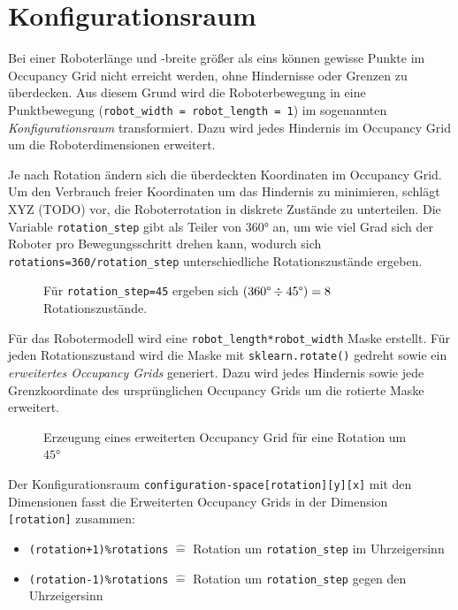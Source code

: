 \chapter{Konfigurationsraum}


Bei einer Roboterlänge und -breite größer als eins können gewisse Punkte im Occupancy Grid nicht erreicht werden, ohne Hindernisse oder Grenzen zu überdecken. 
Aus diesem Grund wird die Roboterbewegung in eine Punktbewegung (\texttt{robot\_width =  robot\_length = 1}) im sogenannten \textit{Konfigurationsraum} transformiert.
Dazu wird jedes Hindernis im Occupancy Grid um die Roboterdimensionen erweitert.

Je nach Rotation ändern sich die überdeckten Koordinaten im Occupancy Grid.
Um den Verbrauch freier Koordinaten um das Hindernis zu minimieren, schlägt XYZ (TODO) vor, die Roboterrotation in diskrete Zustände zu unterteilen. Die Variable \texttt{rotation\_step} gibt als Teiler von $360$° an, um wie viel Grad sich der Roboter pro Bewegungsschritt drehen kann, wodurch sich \texttt{rotations=360/\texttt{rotation\_step}} unterschiedliche Rotationszustände ergeben.
\begin{figure}[H]
	\centering
	\footnotesize
	\centerline{\resizebox{0.6\linewidth}{!}{}}
	\caption{Für \texttt{rotation\_step=45} ergeben sich $(360 \text{\textdegree} \div 45 \text{\textdegree}) = 8$ Rotationszustände.}
\end{figure}

\vspace*{-0.45cm}
Für das Robotermodell wird eine \texttt{robot\_length*robot\_width} Maske erstellt.
Für jeden Rotationszustand wird die Maske mit \texttt{sklearn.rotate()} gedreht sowie ein \textit{erweitertes Occupancy Grids} generiert. Dazu wird jedes Hindernis sowie jede Grenzkoordinate des ursprünglichen Occupancy Grids um die rotierte Maske erweitert.
\begin{figure}[H]
	\centering
	\footnotesize
	\centerline{\resizebox{0.9\linewidth}{!}{}}
	\caption{Erzeugung eines erweiterten Occupancy Grid für eine Rotation um $45$°}
\end{figure}

Der Konfigurationsraum \texttt{configuration-space[rotation][y][x]} mit den Dimensionen fasst die Erweiterten Occupancy Grids in der Dimension \texttt{[rotation]} zusammen:
\begin{itemize}
\item \texttt{(rotation+1)\%rotations} $\widehat{=}$ Rotation um \texttt{rotation\_step} im Uhrzeigersinn
\item \texttt{(rotation-1)\%rotations} $\widehat{=}$ Rotation um \texttt{rotation\_step} gegen den Uhrzeigersinn
\end{itemize}

